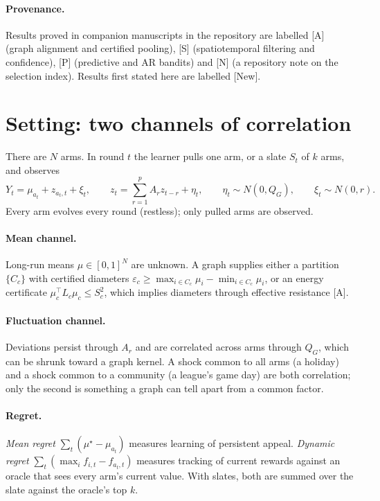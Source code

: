 \documentclass[11pt]{article}
\theoremstyle{definition}
\theoremstyle{remark}
\newcommand{\src}[1]{\textsf{[#1]}}
\begin{document}
\paragraph{Provenance.} Results proved in companion manuscripts in the repository are labelled \src{A} (graph alignment and certified pooling), \src{S} (spatiotemporal filtering and confidence), \src{P} (predictive and AR bandits) and \src{N} (a repository note on the selection index). Results first stated here are labelled \src{New}.

\section{Setting: two channels of correlation}\label{sec:model}

There are $N$ arms. In round $t$ the learner pulls one arm, or a slate $S_t$ of $k$ arms, and observes
\begin{equation}\label{eq:model}
Y_t=\mu_{a_t}+z_{a_t,t}+\xi_t,\qquad z_t=\sum_{r=1}^{p}A_r z_{t-r}+\eta_t,\qquad \eta_t\sim N(0,Q_G),\qquad \xi_t\sim N(0,r).
\end{equation}
Every arm evolves every round (restless); only pulled arms are observed.

\paragraph{Mean channel.} Long-run means $\mu\in[0,1]^N$ are unknown. A graph supplies either a partition $\{C_c\}$ with certified diameters $\varepsilon_c\ge\max_{i\in C_c}\mu_i-\min_{i\in C_c}\mu_i$, or an energy certificate $\mu_c^\top L_c\mu_c\le S_c^2$, which implies diameters through effective resistance \src{A}.

\paragraph{Fluctuation channel.} Deviations persist through $A_r$ and are correlated across arms through $Q_G$, which can be shrunk toward a graph kernel. A shock common to all arms (a holiday) and a shock common to a community (a league's game day) are both correlation; only the second is something a graph can tell apart from a common factor.

\paragraph{Regret.} \emph{Mean regret} $\sum_t(\mu^\star-\mu_{a_t})$ measures learning of persistent appeal. \emph{Dynamic regret} $\sum_t(\max_i f_{i,t}-f_{a_t,t})$ measures tracking of current rewards against an oracle that sees every arm's current value. With slates, both are summed over the slate against the oracle's top $k$.
\end{document}
